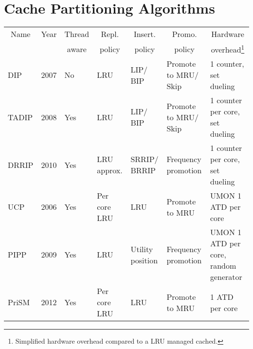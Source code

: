 
\chapter{Cache Partitioning Algorithms}
\label{cpt:algorithms}

\begin{table}[!htb]
\begin{tabular}{|p{1.0cm}|p{0.5cm}|p{0.8cm}|p{1.2cm}|p{1.2cm}|p{1.2cm}|p{1.2cm}|}
\hline
\multicolumn{1}{|c|}{Name} & \multicolumn{1}{c|}{Year} & \multicolumn{1}{c|}{Thread} & \multicolumn{1}{c|}{Repl.} & \multicolumn{1}{c|}{Insert.} & \multicolumn{1}{c|}{Promo.} & \multicolumn{1}{c|}{Hardware}         \\
\multicolumn{1}{|c|}{}          & \multicolumn{1}{c|}{}          & \multicolumn{1}{c|}{aware}  & \multicolumn{1}{c|}{policy}      & \multicolumn{1}{c|}{policy}    & \multicolumn{1}{c|}{policy}    & \multicolumn{1}{c|}{overhead\footnote{Simplified hardware overhead compared to a LRU managed cached.}}         \\ \hline
DIP                             & 2007                           & No                          & LRU                              & LIP/ BIP                        & Promote to MRU/ Skip            & 1 counter, set dueling                \\ \hline
TADIP                           & 2008                           & Yes                         & LRU                              & LIP/ BIP                        & Promote to MRU/ Skip            & 1 counter per core, set dueling           \\ \hline
DRRIP                           & 2010                           & Yes                         & LRU approx.                      & SRRIP/ BRRIP                    & Frequency promotion            & 1 counter per core, set dueling           \\ \hline
UCP                             & 2006                           & Yes                         & Per core LRU                     & LRU                            & Promote to MRU                 & UMON 1 ATD per core                   \\ \hline
PIPP                            & 2009                           & Yes                         & LRU                              & Utility position               & Frequency promotion            & UMON 1 ATD per core, random generator \\ \hline
PriSM                           & 2012                           & Yes                         & Per core LRU                  & LRU                            & Promote to MRU                 & 1 ATD per core                        \\ \hline

\end{tabular}
\end{table}
